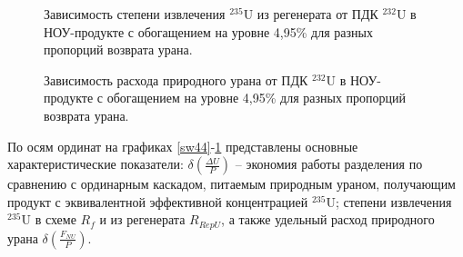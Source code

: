 % 

% 

\begin{figure}
    \centering
    \begin{minipage}{.5\textwidth}
      \centering
      
\caption{{Зависимость степени извлечения $^{235}$U из регенерата от ПДК $^{232}$U в НОУ-продукте с обогащением на уровне 4,95\% для разных пропорций возврата урана.{\label{exR495}}}}
    \end{minipage}%
    \begin{minipage}{.5\textwidth}
      \centering
      
\caption{{Зависимость расхода природного урана от ПДК $^{232}$U в НОУ-продукте с обогащением на уровне 4,95\% для разных пропорций возврата урана.{\label{F0R495}}}}
\end{minipage}
\end{figure}

% 

% 
    
По осям ординат на графиках \ref{sw44}-\ref{F0R495} представлены основные характеристические показатели: $\delta(\frac{\Delta U}{P})$ -- экономия работы разделения по сравнению с ординарным каскадом, питаемым природным ураном, получающим продукт с эквивалентной эффективной концентрацией $^{235}$U; степени извлечения $^{235}$U в схеме $R_f$ и из регенерата $R_{RepU}$, а также удельный расход природного урана $\delta(\frac{F_{NU}}{P})$.

